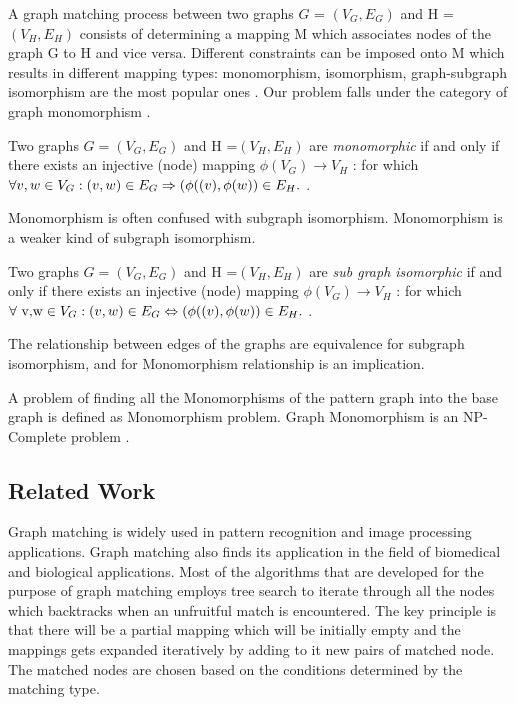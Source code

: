 A graph matching process between two graphs $G$ = $(V_G,E_G)$ and H = $(V_H,E_H)$ consists of determining a mapping M which associates nodes of the graph G to H and vice versa. Different constraints can be imposed onto M which results in different mapping types: monomorphism, isomorphism, graph-subgraph isomorphism are the most popular ones \cite{cordella1999performance}. Our problem falls under the category of graph monomorphism . 

Two graphs 
 $G =( V_G, E_G)$ and
 H =$( V_H, E_H)$  are \textit{monomorphic}  if and only if there exists an injective (node)
mapping $\phi (V_G) \rightarrow  V_H$ : for which $\forall v,w \in V_G:(v,w) \in E_G \Rightarrow (\phi((v),\space \phi(w)) \in E_H.$ \cite{singler2005graph}.

Monomorphism is often confused with subgraph isomorphism. Monomorphism is a weaker kind of subgraph isomorphism.

Two graphs  $G =( V_G, E_G)$ and
 H =$( V_H, E_H)$  are \textit{sub graph isomorphic}  if and only if there exists an injective (node)
mapping $\phi( V_G) \rightarrow  V_H$ : for which $\forall \text{ v,w} \in V_G:(v,w) \in E_G \Leftrightarrow (\phi((v),\space \phi(w)) \in E_H.$ \cite{singler2005graph}.

The relationship between edges of the graphs are equivalence for subgraph isomorphism, and for Monomorphism  relationship  is an implication.

A problem of finding all the Monomorphisms of the pattern graph into the base graph is defined as Monomorphism problem. Graph Monomorphism is an NP-Complete problem \cite{Garey:1979:CIG:578533}. 
\subsection{Related Work}

Graph matching is widely used in pattern recognition and image processing applications. Graph matching also finds its application in the field of biomedical and biological applications. 
Most of the algorithms that are developed for the purpose of graph matching employs tree search to iterate through all the nodes which backtracks when an unfruitful match is encountered.
The key principle is that there will be a partial mapping which will be initially empty and the mappings gets expanded iteratively by adding to it new pairs of matched node. The matched nodes are chosen based on the conditions determined by the matching type.

